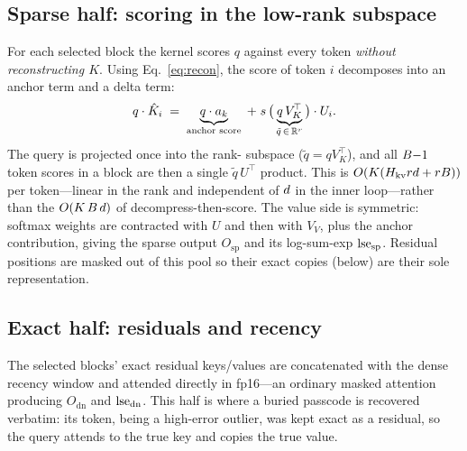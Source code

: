 \subsection{Sparse half: scoring in the low-rank subspace}
For each selected block the kernel scores $q$ against every token \emph{without reconstructing
$K$}. Using Eq.~\eqref{eq:recon}, the score of token $i$ decomposes into an anchor term and a
delta term:
\begin{equation}
  q\cdot \hat K_i \;=\; \underbrace{q\cdot a_k}_{\text{anchor score}}
  \;+\; s\,\big(\underbrace{q\, V_K^{\!\top}}_{\tilde q\,\in\,\mathbb{R}^{r}}\big)\cdot U_i .
  \label{eq:lowrankscore}
\end{equation}
The query is projected once into the rank-\rank{} subspace ($\tilde q = q V_K^{\!\top}$), and all
$B{-}1$ token scores in a block are then a single $\tilde q\,U^{\!\top}$ product. This is
$O(K(H_{\mathrm{kv}} rd + r B))$ per token---linear in the rank and independent of $d$
in the inner loop---rather than the $O(K\,B\,d)$ of decompress-then-score. The value
side is symmetric: softmax weights are contracted with $U$ and then with $V_V$, plus the anchor
contribution, giving the sparse output $O_{\text{sp}}$ and its log-sum-exp $\operatorname{lse}_{\text{sp}}$.
Residual positions are masked out of this pool so their exact copies (below) are their sole
representation.

\subsection{Exact half: residuals and recency}
The selected blocks' exact residual keys/values are concatenated with the dense recency window and
attended directly in fp16---an ordinary masked attention producing $O_{\text{dn}}$ and
$\operatorname{lse}_{\text{dn}}$. This half is where a buried passcode is recovered verbatim: its token, being a
high-error outlier, was kept exact as a residual, so the query attends to the true key and copies
the true value.

